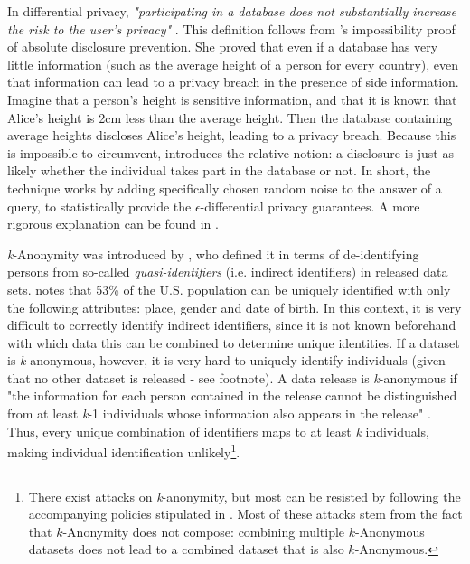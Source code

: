 In differential privacy, \textit{"participating in a database does not substantially increase the risk to the user's privacy"} \citep{diff-privacy}.  This definition follows from \citeauthor{diff-privacy}'s impossibility proof of absolute disclosure prevention. She proved that even if a database has very little information (such as the average height of a person for every country), even that information can lead to a privacy breach in the presence of side information. Imagine that a person's height is sensitive information, and that it is known that Alice's height is 2cm less than the average height. Then the database containing average heights discloses Alice's height, leading to a privacy breach. Because this is impossible to circumvent, \citeauthor{diff-privacy} introduces the relative notion: a disclosure is just as likely whether the individual takes part in the database or not. In short, the technique works by adding specifically chosen random noise to the answer of a query, to statistically provide the \textit{$\epsilon$}-differential privacy guarantees. A more rigorous explanation can be found in \citet[p9-11]{diff-privacy}.

\textit{k}-Anonymity was introduced by \citet{k-anonymity}, who defined it in terms of de-identifying persons from so-called \textit{quasi-identifiers} (i.e. indirect identifiers) in released data sets. \citet{demographics-identify-unique} notes that 53\% of the U.S. population can be uniquely identified with only the following attributes: place, gender and date of birth. In this context, it is very difficult to correctly identify indirect identifiers, since it is not known beforehand with which data this can be combined to determine unique identities. If a dataset is \textit{k}-anonymous, however, it is very hard to uniquely identify individuals (given that no other dataset is released - see footnote). A data release is \textit{k}-anonymous if "the information for each person contained in the release cannot be distinguished from at least \textit{k}-1 individuals whose information also appears in the release" \citep{k-anonymity}. Thus, every unique combination of identifiers maps to at least \textit{k} individuals, making individual identification unlikely\footnote{There exist attacks on \textit{k}-anonymity, but most can be resisted by following the accompanying policies stipulated in \citet{k-anonymity}. Most of these attacks stem from the fact that $k$-Anonymity does not compose: combining multiple $k$-Anonymous datasets does not lead to a combined dataset that is also $k$-Anonymous.}.

